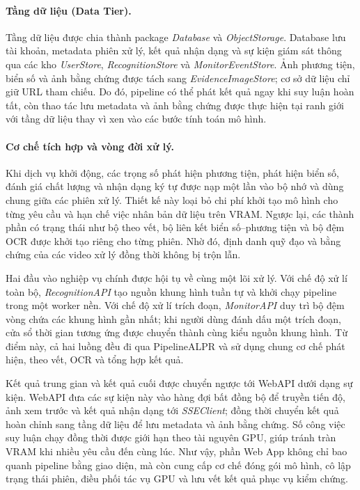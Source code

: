 \documentclass[../DoAn.tex]{subfiles}
\begin{document}
\paragraph{Tầng dữ liệu (Data Tier).}
Tầng dữ liệu được chia thành package \textit{Database} và \textit{ObjectStorage}. Database lưu tài khoản, metadata phiên xử lý, kết quả nhận dạng và sự kiện giám sát thông qua các kho \textit{UserStore}, \textit{RecognitionStore} và \textit{MonitorEventStore}. Ảnh phương tiện, biển số và ảnh bằng chứng được tách sang \textit{EvidenceImageStore}; cơ sở dữ liệu chỉ giữ URL tham chiếu. Do đó, pipeline có thể phát kết quả ngay khi suy luận hoàn tất, còn thao tác lưu metadata và ảnh bằng chứng được thực hiện tại ranh giới với tầng dữ liệu thay vì xen vào các bước tính toán mô hình.

\paragraph{Cơ chế tích hợp và vòng đời xử lý.}
Khi dịch vụ khởi động, các trọng số phát hiện phương tiện, phát hiện biển số, đánh giá chất lượng và nhận dạng ký tự được nạp một lần vào bộ nhớ và dùng chung giữa các phiên xử lý. Thiết kế này loại bỏ chi phí khởi tạo mô hình cho từng yêu cầu và hạn chế việc nhân bản dữ liệu trên VRAM. Ngược lại, các thành phần có trạng thái như bộ theo vết, bộ liên kết biển số--phương tiện và bộ đệm OCR được khởi tạo riêng cho từng phiên. Nhờ đó, định danh quỹ đạo và bằng chứng của các video xử lý đồng thời không bị trộn lẫn.

Hai đầu vào nghiệp vụ chính được hội tụ về cùng một lõi xử lý. Với chế độ xử lí toàn bộ, \textit{RecognitionAPI} tạo nguồn khung hình tuần tự và khởi chạy pipeline trong một worker nền. Với chế độ xử lí trích đoạn, \textit{MonitorAPI} duy trì bộ đệm vòng chứa các khung hình gần nhất; khi người dùng đánh dấu một trích đoạn, cửa sổ thời gian tương ứng được chuyển thành cùng kiểu nguồn khung hình. Từ điểm này, cả hai luồng đều đi qua PipelineALPR và sử dụng chung cơ chế phát hiện, theo vết, OCR và tổng hợp kết quả.

Kết quả trung gian và kết quả cuối được chuyển ngược tới WebAPI dưới dạng sự kiện. WebAPI đưa các sự kiện này vào hàng đợi bất đồng bộ để truyền tiến độ, ảnh xem trước và kết quả nhận dạng tới \textit{SSEClient}; đồng thời chuyển kết quả hoàn chỉnh sang tầng dữ liệu để lưu metadata và ảnh bằng chứng. Số công việc suy luận chạy đồng thời được giới hạn theo tài nguyên GPU, giúp tránh tràn VRAM khi nhiều yêu cầu đến cùng lúc. Như vậy, phần Web App không chỉ bao quanh pipeline bằng giao diện, mà còn cung cấp cơ chế đóng gói mô hình, cô lập trạng thái phiên, điều phối tác vụ GPU và lưu vết kết quả phục vụ kiểm chứng.
\end{document}
